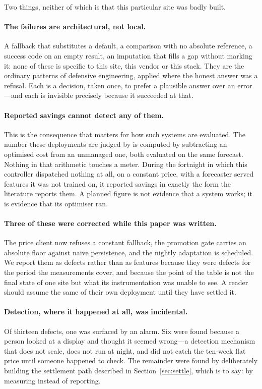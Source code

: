 Two things, neither of which is that this particular site was badly built.

\paragraph{The failures are architectural, not local.}
A fallback that substitutes a default, a comparison with no absolute
reference, a success code on an empty result, an imputation that fills a gap
without marking it: none of these is specific to this site, this vendor or
this stack. They are the ordinary patterns of defensive engineering, applied
where the honest answer was a refusal. Each is a decision, taken once, to
prefer a plausible answer over an error---and each is invisible precisely
because it succeeded at that.

\paragraph{Reported savings cannot detect any of them.}
This is the consequence that matters for how such systems are evaluated. The
number these deployments are judged by is computed by subtracting an optimised
cost from an unmanaged one, both evaluated on the same forecast. Nothing in
that arithmetic touches a meter. During the fortnight in which this controller
dispatched nothing at all, on a constant price, with a forecaster served
features it was not trained on, it reported savings in exactly the form the
literature reports them. A planned figure is not evidence that a system works;
it is evidence that its optimiser ran.

\paragraph{Three of these were corrected while this paper was written.}
The price client now refuses a constant fallback, the promotion gate carries an
absolute floor against naive persistence, and the nightly adaptation is
scheduled. We report them as defects rather than as features because they were
defects for the period the measurements cover, and because the point of the
table is not the final state of one site but what its instrumentation was
unable to see. A reader should assume the same of their own deployment until
they have settled it.

\paragraph{Detection, where it happened at all, was incidental.}
Of thirteen defects, one was surfaced by an alarm. Six were found because a
person looked at a display and thought it seemed wrong---a detection mechanism
that does not scale, does not run at night, and did not catch the ten-week
flat price until someone happened to check. The remainder were found by
deliberately building the settlement path described in
Section~\ref{sec:settle}, which is to say: by measuring instead of reporting.
